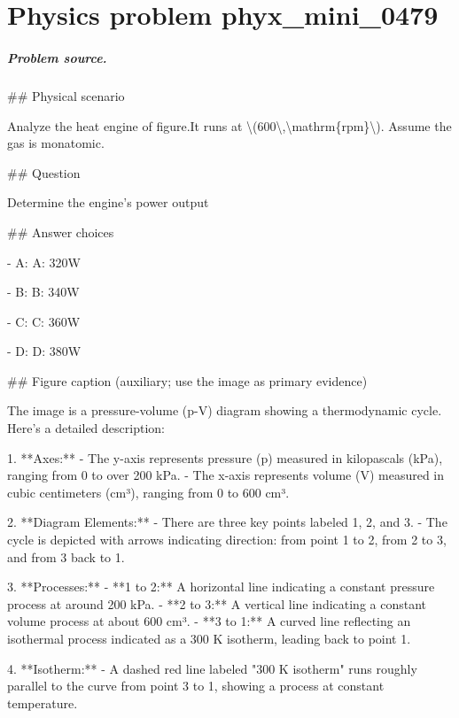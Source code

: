 
\chapter{Physics problem phyx\_mini\_0479}
\label{ch:PhyXMiniProblems_problem_phyx_mini_0479}

\paragraph{Problem source.}
\#\# Physical scenario

Analyze the heat engine of figure.It runs at \textbackslash{}(600\textbackslash{},\textbackslash{}mathrm\{rpm\}\textbackslash{}). Assume the gas is monatomic.

\#\# Question

Determine the engine's power output

\#\# Answer choices

- A: A: 320W

- B: B: 340W

- C: C: 360W

- D: D: 380W

\#\# Figure caption (auxiliary; use the image as primary evidence)

The image is a pressure-volume (p-V) diagram showing a thermodynamic cycle. Here's a detailed description:

1. **Axes:**
   - The y-axis represents pressure (p) measured in kilopascals (kPa), ranging from 0 to over 200 kPa.
   - The x-axis represents volume (V) measured in cubic centimeters (cm³), ranging from 0 to 600 cm³.

2. **Diagram Elements:**
   - There are three key points labeled 1, 2, and 3.
   - The cycle is depicted with arrows indicating direction: from point 1 to 2, from 2 to 3, and from 3 back to 1.

3. **Processes:**
   - **1 to 2:** A horizontal line indicating a constant pressure process at around 200 kPa.
   - **2 to 3:** A vertical line indicating a constant volume process at about 600 cm³.
   - **3 to 1:** A curved line reflecting an isothermal process indicated as a 300 K isotherm, leading back to point 1.

4. **Isotherm:**
   - A dashed red line labeled "300 K isotherm" runs roughly parallel to the curve from point 3 to 1, showing a process at constant temperature. 

